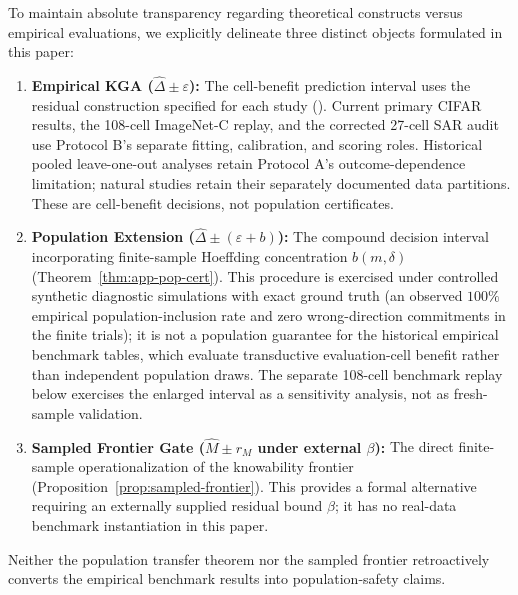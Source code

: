 To maintain absolute transparency regarding theoretical constructs versus empirical evaluations,
we explicitly delineate three distinct objects formulated in this paper:
\begin{enumerate}
 \item \textbf{Empirical KGA ($\widehat\Delta \pm \varepsilon$):}
 The cell-benefit prediction interval uses the residual construction specified for each study
 (). Current primary CIFAR results,
 the 108-cell ImageNet-C replay, and the corrected 27-cell SAR audit use Protocol B's
 separate fitting, calibration, and scoring roles. Historical pooled leave-one-out
 analyses retain Protocol A's outcome-dependence limitation; natural studies retain
 their separately documented data partitions. These are cell-benefit decisions, not population certificates.
 \item \textbf{Population Extension ($\widehat\Delta \pm (\varepsilon + b)$):}
 The compound decision interval incorporating finite-sample Hoeffding concentration $b(m, \delta)$
 (Theorem~\ref{thm:app-pop-cert}). This procedure is exercised under controlled synthetic diagnostic
 simulations with exact ground truth (an observed $100\%$ empirical population-inclusion rate and zero
 wrong-direction commitments in the finite trials); it is
 not a population guarantee for the historical empirical benchmark tables, which evaluate transductive
 evaluation-cell benefit rather than independent population draws. The separate 108-cell benchmark
 replay below exercises the enlarged interval as a sensitivity analysis, not as fresh-sample validation.
 \item \textbf{Sampled Frontier Gate ($\widehat M \pm r_M$ under external $\beta$):}
 The direct finite-sample operationalization of the knowability frontier (Proposition~\ref{prop:sampled-frontier}).
 This provides a formal alternative requiring an externally supplied residual bound $\beta$; it has no
 real-data benchmark instantiation in this paper.
\end{enumerate}
Neither the population transfer theorem nor the sampled frontier retroactively converts the empirical
benchmark results into population-safety claims.

